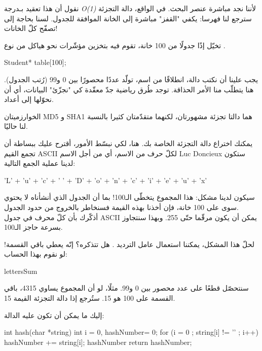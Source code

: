 \begin{information}
نقول أن هذا تعقيد بـدرجة
\textit{\textenglish{O(1)}}
لأننا نجد مباشرة عنصر البحث. في الواقع، دالة التجزئة سترجع لنا فهرسا: يكفي "القفز" مباشرة إلى الخانة الموافقة للجدول. لسنا بحاجة إلى تصفّح كلّ الخانات!
\end{information}

تخيّل إذًا جدولًا من 100 خانة، تقوم فيه بتخزين مؤشّرات نحو هياكل من نوع
.

\begin{Csource}
Student* table[100];
\end{Csource}

يجب علينا أن نكتب دالة، انطلاقًا من اسم، تولّد عددًا محصورًا بين 0 و99 (رُتب الجدول). هنا يتطلّب منا الأمر الحذاقة. توجد طُرق رياضية جدّ معقّدة كي "نجزّئ" البيانات، أي أن نحوّلها إلى أعداد.

\begin{information}
الخوارزميتان
\textenglish{MD5}
و
\textenglish{SHA1}
هما دالتا تجزئة مشهورتان، لكنهما متقدّمتان كثيرا بالنسبة لنا حاليًا.
\end{information}

يمكنك اختراع دالة التجزئة الخاصة بك. هنا، لكي نبسّط الأمور، أقترح عليك ببساطة أن تجمع القيم
\textenglish{ASCII}
لكلّ حرف من الاسم، أي من أجل الاسم
\textenglish{Luc Doncieux}
ستكون لدينا عملية الجمع التالية:

\begin{Csource}
'L' + 'u' + 'c' + ' ' + 'D' + 'o' + 'n' + 'c' + 'i' + 'e' + 'u' + 'x'
\end{Csource}

سيكون لدينا مشكل: هذا المجموع يتخطّى الـ100! بما أن الجدول الذي أنشأناه لا يحتوي سوى على 100 خانة، فإن أخذنا بهذه القيمة فسنخاطر بالخروج من حدود الجدول.\\
أذكّرك بأن كلّ محرف في جدول
\textenglish{ASCII}
يمكن أن يكون مرقّما حتّى 255. وبهذا سنتجاوز بسرعة حاجز الـ100.

لحلّ هذا المشكل، يمكننا استعمال عامل الترديد
\InlineCode{\%}.
هل تتذكره؟ إنّه يعطي باقي القسمة! لو نقوم بهذا الحساب:

\begin{Csource}
lettersSum %
\end{Csource}

سنتحصّل قطعًا على عدد محصور بين 0 و99. مثلًا، لو أن المجموع يساوي 4315، باقي القسمة على 100 هو 15. ستُرجع إذا دالة التجزئة القيمة 15.

إليك ما يمكن أن تكون عليه الدالة:

\begin{Csource}
int hash(char *string)
{
	int i = 0, hashNumber= 0;
	for (i = 0 ; string[i] != '\0' ; i++)
	{
		hashNumber += string[i];
	}
	hashNumber %
	return hashNumber;
}
\end{Csource}

